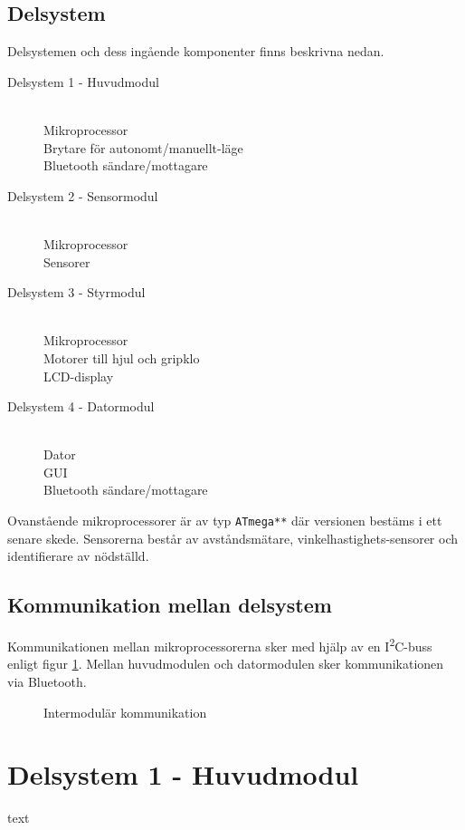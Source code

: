 \documentclass[11pt]{article}
\begin{document}
\begin{flushleft}
\subsection{Delsystem}
Delsystemen och dess ingående komponenter finns beskrivna nedan.
\begin{description}
	\item[Delsystem 1 - Huvudmodul] \hfill \\
	Mikroprocessor \\
	Brytare för autonomt/manuellt-läge \\
	Bluetooth\textsuperscript{\circledR} sändare/mottagare
	\item[Delsystem 2 - Sensormodul] \hfill \\
	Mikroprocessor \\
	Sensorer
	\item[Delsystem 3 - Styrmodul] \hfill \\
	Mikroprocessor \\
	Motorer till hjul och gripklo \\
	LCD-display
	\item[Delsystem 4 - Datormodul] \hfill \\
	Dator \\
	GUI \\
	Bluetooth\textsuperscript{\circledR} sändare/mottagare
\end{description}

Ovanstående mikroprocessorer är av typ \verb+ATmega**+ där versionen bestäms i ett senare skede. Sensorerna består av avståndsmätare, vinkelhastighets-sensorer och identifierare av nödställd. 
\subsection{Kommunikation mellan delsystem}
Kommunikationen mellan mikroprocessorerna sker med hjälp av en I\textsuperscript{2}C-buss enligt figur \ref{communication}. Mellan huvudmodulen och datormodulen sker kommunikationen via Bluetooth\textsuperscript{\circledR}.

\begin{figure}[htbp]
\noindent\resizebox{.97\textwidth}{!}{
		}
	\caption{Intermodulär kommunikation \label{communication}}
\end{figure}

\pagebreak
\section{Delsystem 1 - Huvudmodul}
\label{sec:huvudmodul}
text

\end{flushleft}
\end{document}
